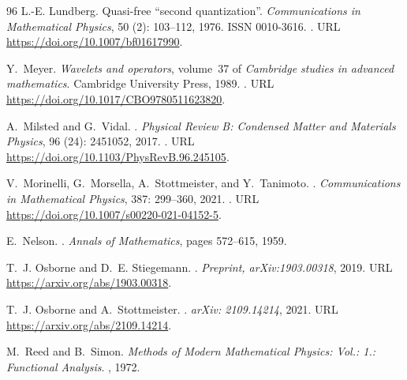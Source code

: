 \documentclass[a4paper, 11pt]{article}
\DeclareMathOperator{\1}{\mathds{1}}
\begin{document}
\begin{thebibliography}{96}
L.-E. Lundberg.
\newblock Quasi-free “second quantization”.
\newblock \emph{Communications in Mathematical Physics}, 50
  (2): 103--112, 1976.
\newblock ISSN 0010-3616.
\newblock {}.
\newblock URL \url{https://doi.org/10.1007/bf01617990}.

Y.~Meyer.
\newblock \emph{Wavelets and operators}, volume~37 of \emph{Cambridge studies
  in advanced mathematics}.
\newblock Cambridge University Press, 1989.
\newblock {}.
\newblock URL \url{https://doi.org/10.1017/CBO9780511623820}.

A.~Milsted and G.~Vidal.
.
\newblock \emph{Physical Review B: Condensed Matter and Materials Physics},
  96 (24): 2451052, 2017.
\newblock {}.
\newblock URL \url{https://doi.org/10.1103/PhysRevB.96.245105}.

V.~Morinelli, G.~Morsella, A.~Stottmeister, and Y.~Tanimoto.
.
\newblock \emph{Communications in Mathematical Physics}, 387:
  299--360, 2021.
\newblock {}.
\newblock URL \url{https://doi.org/10.1007/s00220-021-04152-5}.

E.~{N}elson.
.
\newblock \emph{{Annals of Mathematics}}, pages 572--615, 1959.

T.~J. Osborne and D.~E. Stiegemann.
.
\newblock \emph{Preprint, arXiv:1903.00318}, 2019.
\newblock URL \url{https://arxiv.org/abs/1903.00318}.

T.~J. Osborne and A.~Stottmeister.
.
\newblock \emph{arXiv: 2109.14214}, 2021.
\newblock URL \url{https://arxiv.org/abs/2109.14214}.

M.~{R}eed and B.~{S}imon.
\newblock \emph{{Methods of Modern Mathematical Physics: Vol.: 1.: Functional
  Analysis}}.
, 1972.


\end{thebibliography}
\end{document}
